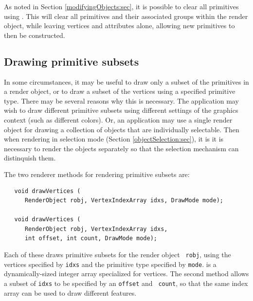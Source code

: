 As noted in Section \ref{modifyingObjects:sec}, it is possible to
clear all primitives using
.  This will
clear all primitives and their associated groups within the render
object, while leaving vertices and attributes alone, allowing new
primitives to then be constructed.

\subsection{Drawing primitive subsets}
\label{drawingPrimitiveSubsets:sec}

In some circumstances, it may be useful to draw only a subset of the
primitives in a render object, or to draw a subset of the vertices
using a specified primitive type.  There may be several reasons why
this is necessary. The application may wish to draw different
primitive subsets using different settings of the graphics context
(such as different colors).  Or, an application may use a single
render object for drawing a collection of objects that are
individually selectable. Then when rendering in selection mode
(Section \ref{objectSelection:sec}), it is it is necessary to render
the objects separately so that the selection mechanism can distinquish
them.

The two renderer methods for rendering primitive subsets are:
%
\begin{lstlisting}
   void drawVertices (
      RenderObject robj, VertexIndexArray idxs, DrawMode mode);

   void drawVertices (
      RenderObject robj, VertexIndexArray idxs, 
      int offset, int count, DrawMode mode);
\end{lstlisting}
%
Each of these draws primitive subsets for the render object {\tt
robj}, using the vertices specified by {\tt idxs} and the primitive
type specified by {\tt mode}.
 is a dynamically-sized
integer array specialized for vertices.  The second method allows a
subset of {\tt idxs} to be specified by an {\tt offset} and {\tt
count}, so that the same index array can be used to draw different
features.

